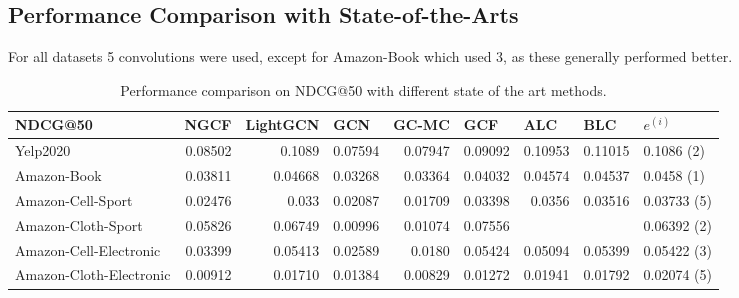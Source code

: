 \subsection{Performance Comparison with State-of-the-Arts}
For all datasets 5 convolutions were used, except for Amazon-Book which used 3, as these generally performed better.


\begin{table*}[] %
    \centering  %
    \begin{tabular}{|l|r|r|r|r|r||r|r|l|}
        \hline
        NDCG@50                 & \multicolumn{1}{l|}{NGCF} & \multicolumn{1}{l|}{LightGCN} & \multicolumn{1}{l|}{GCN} & \multicolumn{1}{l|}{GC-MC} & \multicolumn{1}{l||}{GCF} & \multicolumn{1}{l|}{ALC} & \multicolumn{1}{l|}{BLC} & $e^{(i)}$   \\ \hline
        Yelp2020                & 0.08502                   & 0.1089                        & 0.07594                  & 0.07947                    & 0.09092                   & 0.10953                  & 0.11015                  & 0.1086 (2)  \\ \hline
        Amazon-Book             & 0.03811                   & 0.04668                       & 0.03268                  & 0.03364                    & 0.04032                   & 0.04574                  & 0.04537                  & 0.0458 (1)  \\ \hline
        Amazon-Cell-Sport       & 0.02476                   & 0.033                         & 0.02087                  & 0.01709                    & 0.03398                   & 0.0356                   & 0.03516                  & 0.03733 (5) \\ \hline
        Amazon-Cloth-Sport      & 0.05826                   & 0.06749                       & 0.00996                  & 0.01074                    & 0.07556                   &                          &                          & 0.06392 (2) \\ \hline
        Amazon-Cell-Electronic  & 0.03399                   & 0.05413                       & 0.02589                  & 0.0180                     & 0.05424                   & 0.05094                  & 0.05399                  & 0.05422 (3) \\ \hline
        Amazon-Cloth-Electronic & 0.00912                   & 0.01710                       & 0.01384                  & 0.00829                    & 0.01272                   & 0.01941                  & 0.01792                  & 0.02074 (5) \\ \hline
    \end{tabular}
    \caption{Performance comparison on NDCG@50 with different state of the art methods.}
    \label{tab:baselines-ndcg}
\end{table*}


